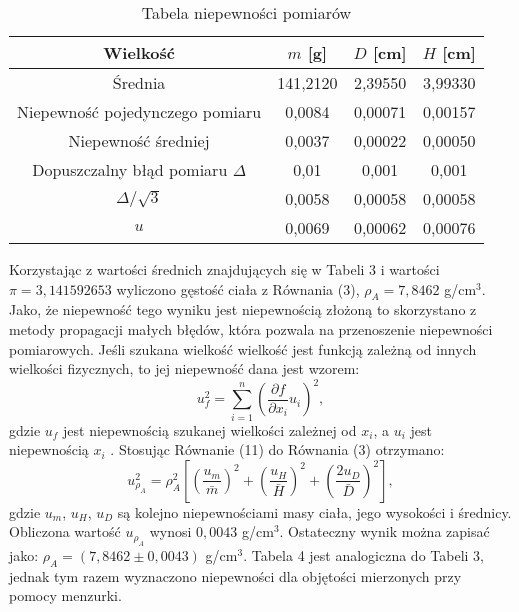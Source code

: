\documentclass[10pt,a4paper]{article}
\begin{document}
  \begin{center}
 \begin{table}[h!]
 \label{3}
 \centering
 \caption{Tabela niepewności pomiarów }
 \begin{tabular}{|c|c|c|c|}
 \hline
 Wielkość &$m$ [g]& $D$ [cm]& $H$ [cm]  \\
 \hline
Średnia & 141,2120 &2,39550&3,99330 \\
\hline
Niepewność pojedynczego pomiaru&0,0084&0,00071&0,00157\\
\hline
Niepewność średniej&0,0037&0,00022&0,00050\\
\hline
Dopuszczalny błąd pomiaru $\Delta$& 0,01&0,001&0,001\\
\hline
$\Delta / \sqrt{3}$&0,0058&0,00058&0,00058\\
\hline
$u$&0,0069&0,00062&0,00076\\
\hline
 \end{tabular}
 \end{table}
 \end{center}
 Korzystając z wartości średnich znajdujących się w Tabeli 3 i wartości $\pi=3,141592653$ wyliczono gęstość ciała z Równania (3), $\rho_{A}=7,8462$ g/cm$^3$. Jako, że niepewność tego wyniku jest niepewnością złożoną to skorzystano z metody propagacji małych błędów, która pozwala na przenoszenie niepewności pomiarowych. Jeśli szukana wielkość wielkość jest funkcją zależną od innych wielkości fizycznych, to jej niepewność dana jest wzorem:
 \begin{equation}
 u_{f}^2=\sum_{i=1}^n \left( \dfrac{\partial f}{\partial x_{i}}u_{i}\right) ^2,
 \end{equation}
 gdzie $u_{f}$ jest niepewnością szukanej wielkości zależnej od $x_{i}$, a $u_{i}$ jest niepewnością $x_{i}$ \cite{tay3}.
 Stosując Równanie (11) do Równania (3) otrzymano:
 \begin{equation}
 u_{\rho_{A}}^2=\rho_{A}^2 \left[ \left(\dfrac{u_{m}}{\bar{m}}\right)^2+\left(\dfrac{u_{H}}{\bar{H}}\right)^2+\left(\dfrac{2u_{D}}{\bar{D}}\right)^2 \right ],
 \end{equation}
 gdzie $u_{m}$, $u_{H}$, $u_{D}$ są kolejno niepewnościami masy ciała, jego wysokości i średnicy. Obliczona wartość $u_{\rho_{A}}$ wynosi $0,0043$ g/cm$^3$.
 Ostateczny wynik można zapisać jako: $\rho_{A}=(7,8462\pm0,0043)$ g/cm$^3$.
 Tabela 4 jest analogiczna do Tabeli 3, jednak tym razem wyznaczono niepewności dla objętości mierzonych przy pomocy menzurki. 
 
\end{document}
